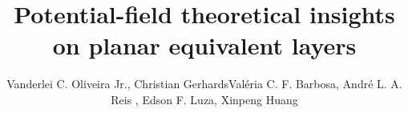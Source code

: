 \documentclass[manuscript,noblind]{geophysics}
\begin{document}
\title{Potential-field theoretical insights on planar equivalent layers}

\renewcommand{\thefootnote}{\fnsymbol{footnote}} 


\address{
	\footnotemark[1] Corresponding author: vanderlei@on.br
	\footnotemark[2] Observat\'orio Nacional, Rio de Janeiro, Brazil\\
	\footnotemark[3] Universidade do Estado do Rio de Janeiro, Rio de Janeiro, Brazil\\
	\footnotemark[4] TU Bergakademie Freiberg, Institute of Geophysics and Geoinformatics, Freiberg, Germany
}
\author{Vanderlei C. Oliveira Jr.\footnotemark[2]\footnotemark[1], Christian Gerhards\footnotemark[4]
Val\'eria C. F. Barbosa\footnotemark[2], Andr\'e L. A. Reis \footnotemark[2]\footnotemark[3],
Edson F. Luza\footnotemark[2], Xinpeng Huang\footnotemark[4]}


\maketitle










%

\clearpage

%



\clearpage




\clearpage



\clearpage
\end{document}

